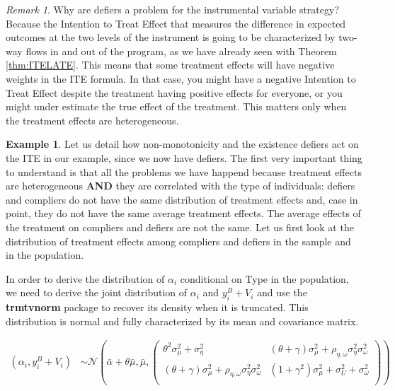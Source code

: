 \documentclass[
]{book}
\theoremstyle{definition}
\theoremstyle{definition}
\newtheorem{example}{Example}[chapter]
\theoremstyle{definition}
\theoremstyle{definition}
\theoremstyle{remark}
\newtheorem*{remark}{Remark}
\begin{document}
\begin{remark}
\iffalse{} {Remark. } \fi{}Why are defiers a problem for the instrumental variable strategy?
Because the Intention to Treat Effect that measures the difference in expected outcomes at the two levels of the instrument is going to be characterized by two-way flows in and out of the program, as we have already seen with Theorem \ref{thm:ITELATE}.
This means that some treatment effects will have negative weights in the ITE formula.
In that case, you might have a negative Intention to Treat Effect despite the treatment having positive effects for everyone, or you might under estimate the true effect of the treatment.
This matters only when the treatment effects are heterogeneous.
\end{remark}

\begin{example}
\protect\hypertarget{exm:unnamed-chunk-146}{}{\label{exm:unnamed-chunk-146} }Let us detail how non-monotonicity and the existence defiers act on the ITE in our example, since we now have defiers.
The first very important thing to understand is that all the problems we have happend because treatment effects are heterogeneous \textbf{AND} they are correlated with the type of individuals: defiers and compliers do not have the same distribution of treatment effects and, case in point, they do not have the same average treatment effects.
The average effects of the treatment on compliers and defiers are not the same.
Let us first look at the distribution of treatment effects among compliers and defiers in the sample and in the population.
\end{example}

In order to derive the distribution of \(\alpha_i\) conditional on Type in the population, we need to derive the joint distribution of \(\alpha_i\) and \(y_i^B+V_i\) and use the \textbf{trmtvnorm} package to recover its density when it is truncated.
This distribution is normal and fully characterized by its mean and covariance matrix.

\begin{align*}
  (\alpha_i,y_i^B+V_i) & \sim \mathcal{N}\left(\bar{\alpha}+\theta\bar{\mu},\bar{\mu},
                                        \left(\begin{array}{cc}
                                              \theta^2\sigma^2_{\mu}+\sigma^2_{\eta} & (\theta+\gamma)\sigma^2_{\mu}+\rho_{\eta,\omega}\sigma^2_{\eta}\sigma^2_{\omega}\\
                                              (\theta+\gamma)\sigma^2_{\mu}+\rho_{\eta,\omega}\sigma^2_{\eta}\sigma^2_{\omega} &  (1+\gamma^2)\sigma^2_{\mu}+\sigma^2_U+\sigma^2_{\omega}\\
                                              \end{array}
                                        \right)
                                      \right)
\end{align*}
\end{document}
